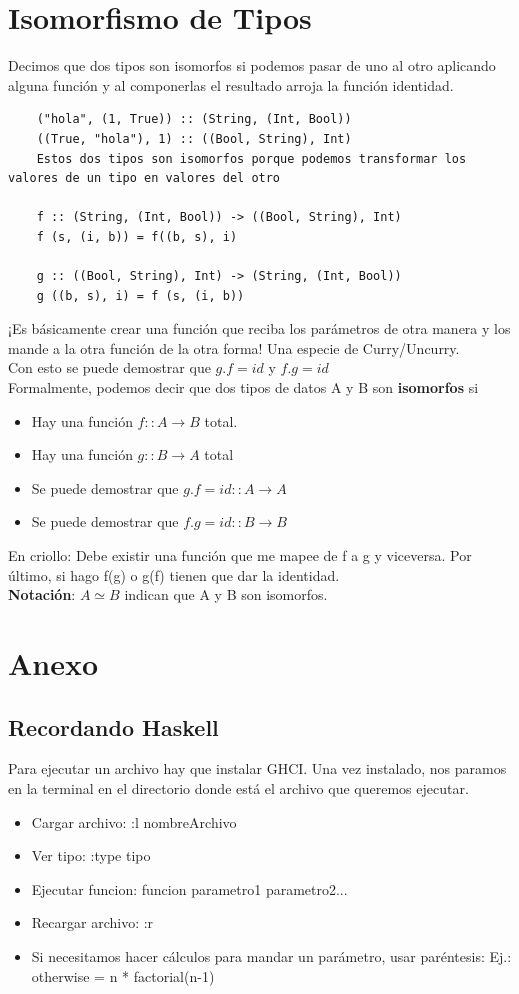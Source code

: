 \documentclass[10pt,a4paper]{article}
\begin{document}
\section*{Isomorfismo de Tipos}
Decimos que dos tipos son isomorfos si podemos pasar de uno al otro aplicando alguna función y al componerlas el resultado arroja la función identidad. 
\begin{lstlisting}
    ("hola", (1, True)) :: (String, (Int, Bool))
    ((True, "hola"), 1) :: ((Bool, String), Int)
    Estos dos tipos son isomorfos porque podemos transformar los valores de un tipo en valores del otro

    f :: (String, (Int, Bool)) -> ((Bool, String), Int)
    f (s, (i, b)) = f((b, s), i)

    g :: ((Bool, String), Int) -> (String, (Int, Bool))
    g ((b, s), i) = f (s, (i, b))

\end{lstlisting}
¡Es básicamente crear una función que reciba los parámetros de otra manera y los mande a la otra función de la otra forma! Una especie de Curry/Uncurry. \\
Con esto se puede demostrar que $g . f = id$ y $f . g = id$ \\
Formalmente, podemos decir que dos tipos de datos A y B son \textbf{isomorfos} si 
\begin{itemize}
    \item Hay una función $f :: A \rightarrow B$ total.
    \item Hay una función $g :: B \rightarrow A$ total 
    \item Se puede demostrar que $g . f = id :: A \rightarrow A$
    \item Se puede demostrar que $f . g = id :: B \rightarrow B$
\end{itemize}
En criollo: Debe existir una función que me mapee de f a g y viceversa. Por último, si hago f(g) o g(f) tienen que dar la identidad. \\
\textbf{Notación}: $A \simeq B$ indican que A y B son isomorfos.


\section*{Anexo}
\subsection*{Recordando Haskell}
Para ejecutar un archivo hay que instalar GHCI. Una vez instalado, nos paramos en la terminal en el directorio donde está el archivo que queremos ejecutar. 
\begin{itemize}
    \item Cargar archivo: :l nombreArchivo
    \item Ver tipo: :type tipo 
    \item Ejecutar funcion: funcion parametro1 parametro2...
    \item Recargar archivo: :r
    \item Si necesitamos hacer cálculos para mandar un parámetro, usar paréntesis: Ej.: otherwise = n * factorial(n-1)
\end{itemize} 
\end{document}
